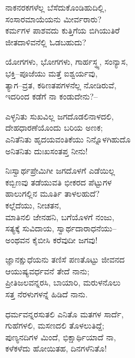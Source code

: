 \begin{myquote}
ನಾಕನರಕಗಳೆಲ್ಲ ಬೆಸೆದುಕೊಂಡಿಹುದಿಲ್ಲಿ,\\ಸಂಸಾರಮಾಯೆಯನು ಮೀರ್ವರಾರು?\\ಕರ್ಮಗಳ ಪಾಶವದು ಕುತ್ತಿಗೆಯ ಬಿಗಿಯುತಿರೆ\\ಜೀತದಾಳಿವನೆಲ್ಲಿ ಓಡಬಹುದು?
\end{myquote}

\begin{myquote}
ಯೋಗಗಳು, ಭೋಗಗಳು, ಗಾರ್ಹಸ್ಥ್ಯ, ಸಂನ್ಯಾಸ,\\ಭಕ್ತಿ–ಪೂಜೆಯು ಮತ್ತೆ ಐಶ್ವರ್ಯವು,\\ತ್ಯಾಗ–ವ್ರತ, ಕಠಿಣತಪಗಳನೆಲ್ಲ ನೋಡಿರುವೆ,\\ಇದರಿಂದ ಕಡೆಗೆ ನಾ ಕಂಡುದೇನು?–
\end{myquote}

\begin{myquote}
ಎಳ್ಳನಿತು ಸುಖವಿಲ್ಲ ಜಗದೊಡಲಿನಾಳದಲಿ,\\ದೇಹಧಾರಣೆಯೊಂದು ಬರಿಯ ಅಣಕ; \\ಎನಿತೆನಿತು ಹೃದಯವಂತಿಕೆಯು ನಿನ್ನೊಳಗಿಹುದೊ\\ಅನಿತನಿತು ದುಃಖಸಂತಪ್ತ ನೀನು!
\end{myquote}

\begin{myquote}
ನಿಃಸ್ವಾರ್ಥಪ್ರೇಮಿಗೀ ಜಗದೊಳಗೆ ಎಡೆಯಿಲ್ಲ\\ಕಬ್ಬಿಣವು ತಡೆಯುವತಿ ಭೀಕರದ ಪೆಟ್ಟುಗಳ\\ಹಾಲುಗಲ್ಲಿನ ಮೂರ್ತಿ ತಾಳಲಹುದೆ?\\ಕಲ್ಲೆದೆಯು, ನೀಚತನ,\\ಮಾತಿನಲಿ ಜೇನಹನಿ, ಬಗೆಯೊಳಗೆ ನಂಜು,\\ಸತ್ಯಕ್ಕೆ ಸುವಿದಾಯ, ಸ್ವಾರ್ಥದಾರಾಧನೆಯು–\\ಅಂಥವನ ಕೈಬೀಸಿ ಕರೆವುದೀ ಜಗವು!
\end{myquote}

\begin{myquote}
ಜ್ಞಾನಕ್ಷುಧೆಯನು ತಣಿಸೆ ಪಣತೊಟ್ಟು ಜೀವನದ \\ಆಯುಷ್ಯವರ್ಧವನೆ ತೇದೆ ನಾನು;\\ಪ್ರೀತಿಜಲವನ್ನರಸಿ, ಬಾಯಾರಿ, ಮರುಳನೊಲು\\ಸತ್ತ ನೆರಳುಗಳನ್ನೆ ಹಿಡಿದೆ ನಾನು.
\end{myquote}

\begin{myquote}
ಧರ್ಮವನ್ನರಸುತಲಿ ಎನಿತೊ ಮತಗಳ ಸಾರ್ದೆ,\\ಗುಹೆಗಳಲಿ, ಮಸಣದಲಿ ತೊಳಲುತಿದ್ದೆ;\\ಪುಣ್ಯನದಿಗಳ ಮಿಂದೆ, ಭಿಕ್ಷಾರ್ಥಿಯಾದೆ ನಾ,\\ಕಳೆಕಳೆದು ಹೋಯಿತಹ, ದಿನಗಳೆನಿತೊ!
\end{myquote}

